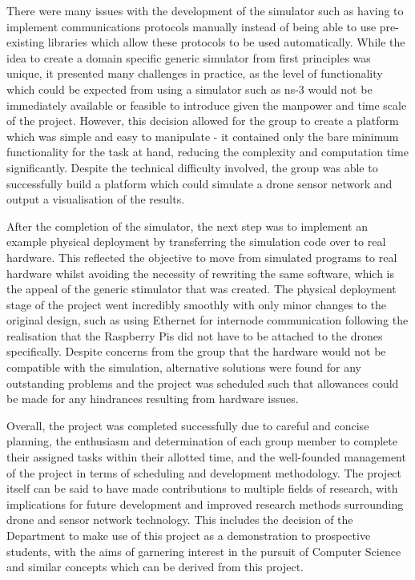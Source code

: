 There were many issues with the development of the simulator such as having to implement communications protocols manually instead of being able to use pre-existing libraries which allow these protocols to be used automatically. While the idea to create a domain specific generic simulator from first principles was unique, it presented many challenges in practice, as the level of functionality which could be expected from using a simulator such as ns-3 would not be immediately available or feasible to introduce given the manpower and time scale of the project. However, this decision allowed for the group to create a platform which was simple and easy to manipulate - it contained only the bare minimum functionality for the task at hand, reducing the complexity and computation time significantly. Despite the technical difficulty involved, the group was able to successfully build a platform which could simulate a drone sensor network and output a visualisation of the results.

After the completion of the simulator, the next step was to implement an example physical deployment by transferring the simulation code over to real hardware. This reflected the objective to move from simulated programs to real hardware whilst avoiding the necessity of rewriting the same software, which is the appeal of the generic stimulator that was created. The physical deployment stage of the project went incredibly smoothly with only minor changes to the original design, such as using Ethernet for internode communication following the realisation that the Raspberry Pis did not have to be attached to the drones specifically. Despite concerns from the group that the hardware would not be compatible with the simulation, alternative solutions were found for any outstanding problems and the project was scheduled such that allowances could be made for any hindrances resulting from hardware issues.

Overall, the project was completed successfully due to careful and concise planning, the enthusiasm and determination of each group member to complete their assigned tasks within their allotted time, and the well-founded management of the project in terms of scheduling and development methodology. The project itself can be said to have made contributions to multiple fields of research, with implications for future development and improved research methods surrounding drone and sensor network technology. This includes the decision of the Department to make use of this project as a demonstration to prospective students, with the aims of garnering interest in the pursuit of Computer Science and similar concepts which can be derived from this project.

